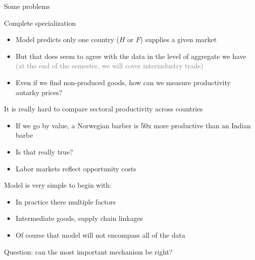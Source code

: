 \documentclass[notes,11pt, aspectratio=169, xcolor=table]{beamer}
\newenvironment{wideitemize}{\itemize\addtolength{\itemsep}{10pt}}{\enditemize}
\begin{document}
\begin{frame}{Some problems}
    \begin{wideitemize}
        \item Complete specialization

        \begin{itemize}
            \item Model predicts only one country ($H$ or $F$) supplies a given market

            \item<2-> But that does seem to agree with the data in the level of aggregate we have
                \qquad \textcolor{gray}{(at the end of the semester, we will cover interindustry trade)}

            \item<3-> Even if we find non-produced goods, how can we measure productivity autarky prices?
        \end{itemize}

        \item<4-> It is really hard to compare sectoral productivity across countries

        \begin{itemize}
            \item<4-> If we go by value, a Norwegian barber is 50x more productive than an Indian barbe
            \item<5-> Is that really true?
            \item<6-> Labor markets reflect opportunity costs
        \end{itemize}

        \item<7-> Model is very simple to begin with:
        \begin{itemize}
            \item<7-> In practice there multiple factors
            \item<8-> Intermediate goods, supply chain linkages
            \item<9-> Of course that model will not encompass all of the data
        \end{itemize}

        \item<10-> Question: can the most important mechanism be right?

    \end{wideitemize}
\end{frame}
\end{document}
